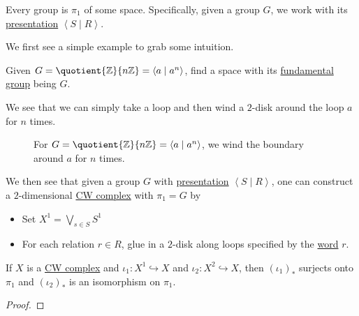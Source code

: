 \begin{remark}
	Every group is \(\pi _1\) of some space. Specifically, given a group \(G\), we work with its \hyperref[def:group-presentation]{presentation} \(\left< S\mid R \right> \).
\end{remark}
\begin{explanation}
	We first see a simple example to grab some intuition.
	\begin{eg}
		Given \(G = \quotient{\mathbb{Z} }{n\mathbb{Z} } = \left< a\mid a^n \right>\),
		find a space with its \hyperref[def:fundamental-group]{fundamental group} being \(G\).
	\end{eg}
	\begin{explanation}
		We see that we can simply take a loop and then wind a \(2\)-disk around the loop \(a\) for \(n\) times.
		\begin{figure}[H]
			\centering
			\caption{For \(G = \quotient{\mathbb{Z}}{n\mathbb{Z} } = \left< a \mid a^n \right> \), we wind the boundary around \(a\) for \(n\) times.}
			\label{fig:lec12-eg}
		\end{figure}
	\end{explanation}
	We then see that given a group \(G\) with \hyperref[def:group-presentation]{presentation} \(\left< S \mid R \right> \), one can construct a \(2\)-dimensional \hyperref[def:CW-Complex]{CW complex}
	with \(\pi _1 = G\) by
	\begin{itemize}
		\item Set \(X^1 = \bigvee_{s\in S} S^1\)
		\item For each relation \(r\in R\), glue in a \(2\)-disk along loops specified by the \hyperref[def:word]{word} \(r\).
	\end{itemize}
\end{explanation}

\begin{theorem}
	If \(X\) is a \hyperref[def:CW-Complex]{CW complex} and \(\iota _1\colon X^1\hookrightarrow X\) and \(\iota_2 \colon X^2\hookrightarrow X\),
	then \((\iota _1)_{\ast}\) surjects onto \(\pi _1\) and \((\iota _2)_{\ast}\) is an isomorphism on \(\pi _1\).
\end{theorem}
\begin{proof}
\end{proof}